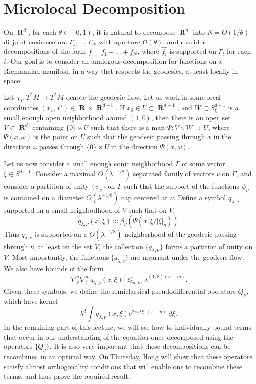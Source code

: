 \documentclass{article}
\DeclareMathOperator{\RR}{\mathbf{R}}
\theoremstyle{plain}
\theoremstyle{remark}
\theoremstyle{definition}
\begin{document}
\section{Microlocal Decomposition}

On $\RR^d$, for each $\theta \in (0,1)$, it is natural to decompose $\RR^n$ into $N = O(1/\theta)$ disjoint conic sectors $\Gamma_1,\dots,\Gamma_N$ with aperture $O(\theta)$, and consider decompositions of the form $f = f_1 + \dots + f_N$, where $\widehat{f_i}$ is supported on $\Gamma_i$ for each $i$. Our goal is to consider an analogous decomposition for functions on a Riemannian manifold, in a way that respects the geodesics, at least locally in space.

Let $\chi_t: T^*M \to T^*M$ denote the geodesic flow. Let us work in some local coordinates $(x_1,x') \in \RR \times \RR^{d-1}$. If $x_0 \in U \subset \RR^{d-1}$, and $W \subset S^{d-1}_\xi$ is a small enough open neighborhood around $(1,0)$, then there is an open set $V \subset \RR^d$ containing $\{ 0 \} \times U$ such that there is a map $\Psi: V \times W \to U$, where $\Psi(x,\omega)$ is the point on $U$ such that the geodesic passing through $x$ in the direction $\omega$ passes through $\{ 0 \} \times U$ in the direction $\Psi(x,\omega)$.

Let us now consider a small enough conic neighborhood $\Gamma$ of some vector $\xi \in S^{d-1}$. Consider a maximal $O(\lambda^{-1/8})$ separated family of vectors $\nu$ on $\Gamma$, and consider a partition of unity $\{ \psi_\nu \}$ on $\Gamma$ such that the support of the functions $\psi_\nu$ is contained on a diameter $O(\lambda^{-1/8})$ cap centered at $\nu$. Define a symbol $q_{\lambda,\nu}$ supported on a small neighbodhood of $V$ such that on $V$,
%
\[ q_{\lambda,\nu}(x,\xi) \approx \beta_\nu(\Psi(x, \xi / |\xi|_g ))   \]
%
Thus $q_{\lambda,\nu}$ is supported on a $O(\lambda^{-1/8})$ neighborhood of the geodesic passing through $\nu$, at least on the set $V$, the collection $\{ q_{\lambda,\nu} \}$ forms a partition of unity on $V$. Most importantly, the functions $\{ q_{\lambda,\nu} \}$ are invariant under the geodesic flow. We also have bounds of the form
%
\[ |\nabla_x^n \nabla_\xi^m q_{\lambda,\nu}(x,\xi)| \lesssim_{n,m} \lambda^{(1/8)(n + m)}. \]
%
Given these symbols, we define the semiclassical pseudodifferential operators $Q_\nu$, which have kernel
%
\[ \lambda^d \int q_{\lambda,\nu}(x,\xi) e^{2 \pi i \lambda \xi \cdot (x - y)}\; d\xi. \]
%
In the remaining part of this lecture, we will see how to individually bound terms that occur in our understanding of the equation once decomposed using the operators $\{ Q_\nu \}$. It is also very important that these decompositions can be recombined in an optimal way. On Thursday, Hong will show that these operators satisfy almost orthogonality conditions that will enable one to recombine these terms, and thus prove the required result.
\end{document}
